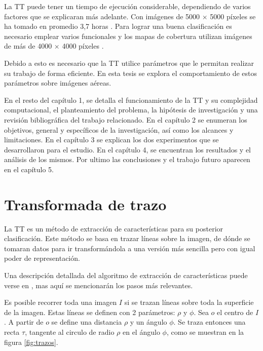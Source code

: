 La TT puede tener un tiempo de ejecución considerable, dependiendo de varios factores que se explicaran más adelante. Con imágenes de 5000 $\times$ 5000 píxeles se ha tomado en promedio 3,7 horas \cite{Garita2013}. Para lograr una buena clasificación es necesario emplear varios funcionales y los mapas de cobertura utilizan imágenes de más de 4000 $\times$ 4000 píxeles \cite{RapidEye2012}. 

Debido a esto es necesario que la TT utilice parámetros que le permitan realizar su trabajo de forma eficiente. En esta tesis se explora el comportamiento de estos parámetros sobre imágenes aéreas. 

En el resto del capítulo 1, se detalla el funcionamiento de la TT y su complejidad computacional, el planteamiento del problema, la hipótesis de investigación y una revisión bibliográfica del trabajo relacionado.
En el capítulo 2 se enumeran los objetivos, general y específicos de la investigación, así como los alcances y limitaciones.
En el capítulo 3 se explican los dos experimentos que se desarrollaron para el estudio.
En el capítulo 4, se encuentran los resultados y el análisis de los mismos.
Por ultimo las conclusiones y el trabajo futuro aparecen en el capítulo 5.


\section{Transformada de trazo}
La TT es un método de extracción de características para su posterior clasificación. Este método se basa en trazar líneas sobre la imagen, de dónde se tomaran datos para ir transformándola a una versión más sencilla pero con igual poder de representación.

Una descripción detallada del algoritmo de extracción de características puede verse en \cite{Tutorial2008}, mas aquí se mencionarán los pasos más relevantes.

Es posible recorrer toda una imagen $I$ si se trazan líneas sobre toda la superficie de la imagen.
Estas líneas se definen con 2 parámetros: $\rho$ y $\phi$. Sea $o$ el centro de $I$. A partir de $o$ se define una distancia $\rho$ y un ángulo $\phi$. Se traza entonces una recta $\tau$, tangente al circulo de radio $\rho$ en el ángulo $\phi$, como se muestran en la figura \ref{fig:trazos}.

